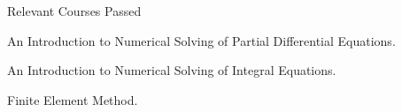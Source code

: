 \begin{rSection}{Relevant Courses Passed}	
	\begin{rSubsection}{}{}{}{}
		\item An Introduction to Numerical Solving of Partial Differential Equations.
		\item An Introduction to Numerical Solving of Integral Equations.
		\item Finite Element Method.\\\\
	\end{rSubsection}	
\end{rSection}